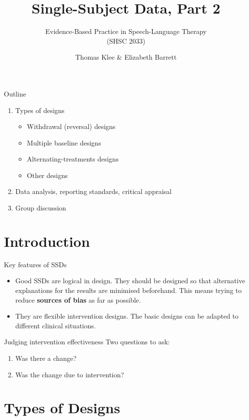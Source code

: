 \documentclass{beamer}
\title{Single-Subject Data, Part 2}
\subtitle{}
\author{Evidence-Based Practice in Speech-Language Therapy \\ (SHSC 2033)}
\institute{Session 7}
\date{Thomas Klee \& Elizabeth Barrett}
\begin{document}
\begin{frame}
	\titlepage
\end{frame}

% 
\begin{frame}{Outline}
	\begin{enumerate}
	\item Types of designs
		\begin{itemize}
		\item Withdrawal (reversal) designs 
		\item Multiple baseline designs
		\item Alternating-treatments designs
		\item Other designs
		\end{itemize}
	\item Data analysis, reporting standards, critical appraisal 
	\item Group discussion
	\end {enumerate}
\end{frame}

\section{Introduction}

% 
\begin{frame}{Key features of SSDs}
	\begin{itemize}
	\item Good SSDs are \alert{logical} in design. They should be designed so that alternative explanations for the results are minimised beforehand. This means trying to reduce \textbf{sources of bias} as far as possible.
	\item They are \alert{flexible} intervention designs. The basic designs can be adapted to different clinical situations.
	\end{itemize}
\end{frame}

% 
\begin{frame}{Judging intervention effectiveness}
Two questions to ask:
	\begin{enumerate}
	\item Was there a change?
	\item Was the change due to intervention?
	\end{enumerate}
\end{frame}

\section{Types of Designs}
\end{document}
